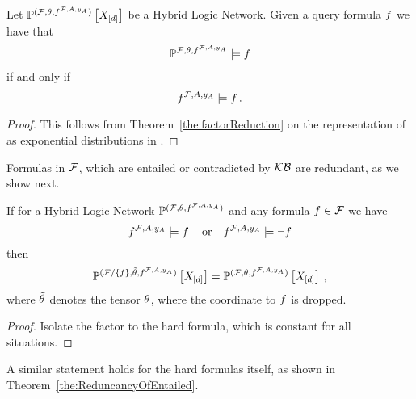 \begin{theorem}
    \label{the:hlnEntailmentReduction}
    Let $\mathbb{P}^{(\mathcal{F},\theta,f^{\mathcal{F},A,y_{A}})}\left[X_{[d]}\right]$ be a Hybrid Logic Network.
    Given a query formula $f$ we have that
    \begin{align*}
        \mathbb{P}^{\mathcal{F},\theta,f^{\mathcal{F},A,y_{A}}} \models f
    \end{align*}
    if and only if
    \[ f^{\mathcal{F},A,y_{A}} \models f \, . \]
\end{theorem}
\begin{proof}
    This follows from Theorem~\ref{the:factorReduction} on the representation of \HybridLogicNetworks{} as exponential distributions in .
\end{proof}


Formulas in $\mathcal{F}$, which are entailed or contradicted by $\mathcal{KB}$ are redundant, as we show next.

\begin{theorem}%
    If for a Hybrid Logic Network $\mathbb{P}^{(\mathcal{F},\theta,f^{\mathcal{F},A,y_{A}})}$ and any formula $f\in\mathcal{F}$ we have
    \[ f^{\mathcal{F},A,y_{A}} \models f \, \quad \text{or} \quad f^{\mathcal{F},A,y_{A}} \models \lnot f \]
    then
    \[ \mathbb{P}^{(\mathcal{F}/\{f\},\tilde{\theta},f^{\mathcal{F},A,y_{A}})}\left[X_{[d]}\right] =  \mathbb{P}^{(\mathcal{F},\theta,f^{\mathcal{F},A,y_{A}})}\left[X_{[d]}\right]  \, , \]
    where $\tilde{\theta}$ denotes the tensor $\theta$, where the coordinate to $f$ is dropped. %
\end{theorem}
\begin{proof}
    Isolate the factor to the hard formula, which is constant for all situations.
\end{proof}

A similar statement holds for the hard formulas itself, as shown in Theorem~\ref{the:ReduncancyOfEntailed}.


